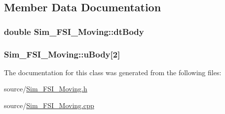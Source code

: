 \subsection{Member Data Documentation}
\hypertarget{class_sim___f_s_i___moving_a0afe565eb23a49fd97956ff02f0b755a}{}
\subsubsection[{dt\+Body}]{\setlength{\rightskip}{0pt plus 5cm}double Sim\+\_\+\+F\+S\+I\+\_\+\+Moving\+::dt\+Body\hspace{0.3cm}{\ttfamily [protected]}}\label{class_sim___f_s_i___moving_a0afe565eb23a49fd97956ff02f0b755a}
\hypertarget{class_sim___f_s_i___moving_a0375337ef732a1485729637ca0c34057}{}
\subsubsection[{u\+Body}]{ Sim\+\_\+\+F\+S\+I\+\_\+\+Moving\+::u\+Body\mbox{[}2\mbox{]}\hspace{0.3cm}{\ttfamily [protected]}}\label{class_sim___f_s_i___moving_a0375337ef732a1485729637ca0c34057}


The documentation for this class was generated from the following files\+:\begin{DoxyCompactItemize}
\item 
source/\hyperlink{_sim___f_s_i___moving_8h}{Sim\+\_\+\+F\+S\+I\+\_\+\+Moving.\+h}\item 
source/\hyperlink{_sim___f_s_i___moving_8cpp}{Sim\+\_\+\+F\+S\+I\+\_\+\+Moving.\+cpp}\end{DoxyCompactItemize}
